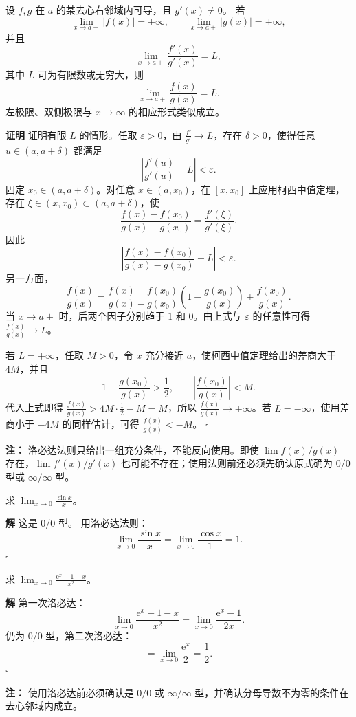 \documentclass[fontset=fandol]{ctexart}
\newenvironment{proofdetail}{\par\noindent\textbf{证明}\quad}{\hfill$\square$\par\vspace{0.8em}}
\newenvironment{solution}{\par\noindent\textbf{解}\quad}{\hfill$\square$\par\vspace{0.8em}}
\newenvironment{warning}{\par\noindent\textbf{注：}\quad}{\par\vspace{0.8em}}
\newcommand{\ee}{\mathrm{e}}
\begin{document}
\begin{theorem}
设 $f,g$ 在 $a$ 的某去心右邻域内可导，且 $g'(x)\neq0$。 若
\[
\lim_{x\to a+}|f(x)|=+\infty,\qquad
\lim_{x\to a+}|g(x)|=+\infty,
\]
并且
\[
\lim_{x\to a+}\frac{f'(x)}{g'(x)}=L,
\]
其中 $L$ 可为有限数或无穷大，则
\[
\lim_{x\to a+}\frac{f(x)}{g(x)}=L.
\]
左极限、双侧极限与 $x\to\infty$ 的相应形式类似成立。
\end{theorem}
\begin{proofdetail}
证明有限 \(L\) 的情形。任取 \(\varepsilon>0\)，由 \(\frac{f'}{g'}\to L\)，存在 \(\delta>0\)，使得任意 \(u\in(a,a+\delta)\) 都满足
\[
\left|\frac{f'(u)}{g'(u)}-L\right|<\varepsilon.
\]
固定 \(x_0\in(a,a+\delta)\)。对任意 \(x\in(a,x_0)\)，在 \([x,x_0]\) 上应用柯西中值定理，存在 \(\xi\in(x,x_0)\subset(a,a+\delta)\)，使
\[
\frac{f(x)-f(x_0)}{g(x)-g(x_0)}=\frac{f'(\xi)}{g'(\xi)}.
\]
因此
\[
\left|\frac{f(x)-f(x_0)}{g(x)-g(x_0)}-L\right|<\varepsilon.
\]
另一方面，
\[
\frac{f(x)}{g(x)}
=\frac{f(x)-f(x_0)}{g(x)-g(x_0)}
\left(1-\frac{g(x_0)}{g(x)}\right)
+\frac{f(x_0)}{g(x)}.
\]
当 \(x\to a+\) 时，后两个因子分别趋于 \(1\) 和 \(0\)。由上式与 \(\varepsilon\) 的任意性可得 \(\frac{f(x)}{g(x)}\to L\)。

若 \(L=+\infty\)，任取 \(M>0\)，令 \(x\) 充分接近 \(a\)，使柯西中值定理给出的差商大于 \(4M\)，并且
\[
1-\frac{g(x_0)}{g(x)}>\frac12,
\qquad
\left|\frac{f(x_0)}{g(x)}\right|<M.
\]
代入上式即得 \(\frac{f(x)}{g(x)}>4M\cdot\frac12-M=M\)，所以 \(\frac{f(x)}{g(x)}\to+\infty\)。若 \(L=-\infty\)，使用差商小于 \(-4M\) 的同样估计，可得 \(\frac{f(x)}{g(x)}<-M\)。
\end{proofdetail}

\begin{warning}
洛必达法则只给出一组充分条件，不能反向使用。即使 \(\lim f(x)/g(x)\) 存在，\(\lim f'(x)/g'(x)\) 也可能不存在；使用法则前还必须先确认原式确为 \(0/0\) 型或 \(\infty/\infty\) 型。
\end{warning}

\begin{example}[$0/0$ 型]
求 $\displaystyle\lim_{x\to0}\frac{\sin x}{x}$。
\end{example}
\begin{solution}
这是 $0/0$ 型。 用洛必达法则：
\[
\lim_{x\to0}\frac{\sin x}{x}=\lim_{x\to0}\frac{\cos x}{1}=1.
\]
\end{solution}

\begin{example}[多次使用]
求 $\displaystyle\lim_{x\to0}\frac{\ee^x-1-x}{x^2}$。
\end{example}
\begin{solution}
第一次洛必达：
\[
\lim_{x\to0}\frac{\ee^x-1-x}{x^2}
=\lim_{x\to0}\frac{\ee^x-1}{2x}.
\]
仍为 $0/0$ 型，第二次洛必达：
\[
=\lim_{x\to0}\frac{\ee^x}{2}=\frac12.
\]
\end{solution}
\begin{warning}
使用洛必达前必须确认是 $0/0$ 或 $\infty/\infty$ 型，并确认分母导数不为零的条件在去心邻域内成立。
\end{warning}
\end{document}

